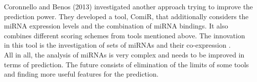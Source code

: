 \documentclass[11pt,  a4paper]{report}
\begin{document}
Coronnello and Benos (2013) investigated another approach trying to improve the prediction power. They developed a tool, ComiR, that additionally considers the miRNA expression levels and the combination of miRNA bindings. It also combines different scoring schemes from tools mentioned above. The innovation in this tool is the investigation of sets of miRNAs and their co-expression \cite{Coronnello}. \\

All in all, the analysis of miRNAs is very complex and needs to be improved in terms of prediction. The future consists of elimination of the limits of some tools and finding more useful features for the prediction.






\listoffigures
\listoftables




\end{document}
